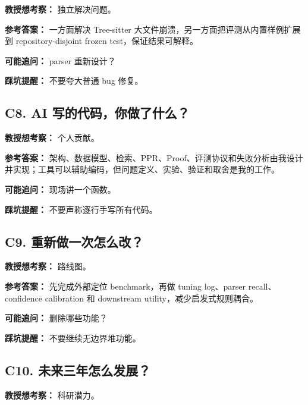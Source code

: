 \documentclass[UTF8,12pt,openany]{ctexbook}
\begin{document}
\textbf{教授想考察：} 独立解决问题。\par

\textbf{参考答案：} 一方面解决 Tree-sitter 大文件崩溃，另一方面把评测从内置样例扩展到 repository-disjoint frozen test，保证结果可解释。\par

\textbf{可能追问：} parser 重新设计？\par

\textbf{踩坑提醒：} 不要夸大普通 bug 修复。\par

\subsection{C8. AI 写的代码，你做了什么？}

\textbf{教授想考察：} 个人贡献。\par

\textbf{参考答案：} 架构、数据模型、检索、PPR、Proof、评测协议和失败分析由我设计并实现；工具可以辅助编码，但问题定义、实验、验证和取舍是我的工作。\par

\textbf{可能追问：} 现场讲一个函数。\par

\textbf{踩坑提醒：} 不要声称逐行手写所有代码。\par

\subsection{C9. 重新做一次怎么改？}

\textbf{教授想考察：} 路线图。\par

\textbf{参考答案：} 先完成外部定位 benchmark，再做 tuning log、parser recall、confidence calibration 和 downstream utility，减少启发式规则耦合。\par

\textbf{可能追问：} 删除哪些功能？\par

\textbf{踩坑提醒：} 不要继续无边界堆功能。\par

\subsection{C10. 未来三年怎么发展？}

\textbf{教授想考察：} 科研潜力。\par
\end{document}
